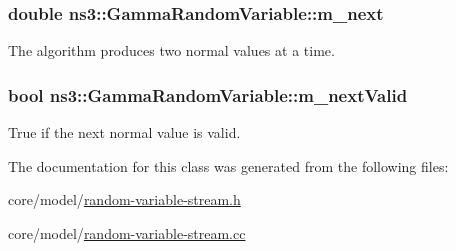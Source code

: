 \subsubsection[{\texorpdfstring{m\+\_\+next}{m_next}}]{\setlength{\rightskip}{0pt plus 5cm}double ns3\+::\+Gamma\+Random\+Variable\+::m\+\_\+next\hspace{0.3cm}{\ttfamily [private]}}\hypertarget{classns3_1_1GammaRandomVariable_a192cfe661857c7e669e19a7984fd9491}{}\label{classns3_1_1GammaRandomVariable_a192cfe661857c7e669e19a7984fd9491}
The algorithm produces two normal values at a time. 
\subsubsection[{\texorpdfstring{m\+\_\+next\+Valid}{m_nextValid}}]{\setlength{\rightskip}{0pt plus 5cm}bool ns3\+::\+Gamma\+Random\+Variable\+::m\+\_\+next\+Valid\hspace{0.3cm}{\ttfamily [private]}}\hypertarget{classns3_1_1GammaRandomVariable_a9824f728f2f97299387ca3990464de85}{}\label{classns3_1_1GammaRandomVariable_a9824f728f2f97299387ca3990464de85}
True if the next normal value is valid. 

The documentation for this class was generated from the following files\+:\begin{DoxyCompactItemize}
\item 
core/model/\hyperlink{random-variable-stream_8h}{random-\/variable-\/stream.\+h}\item 
core/model/\hyperlink{random-variable-stream_8cc}{random-\/variable-\/stream.\+cc}\end{DoxyCompactItemize}

